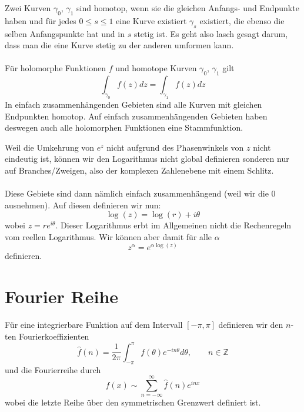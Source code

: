 \documentclass[11pt]{article}
\newenvironment{problem}[1]{
    \begin{trivlist}
        \item[\hskip \labelsep {\bfseries #1}] }{
    \end{trivlist}\normalshape
}
\newcommand{\Z}{\mathbb{Z}}
\begin{document}
    \begin{problem}{Homotopie}
        Zwei Kurven $\gamma_0$, $\gamma_1$ sind homotop, wenn sie die gleichen
        Anfangs- und Endpunkte haben und für jedes $0\leq s\leq 1$ eine
        Kurve existiert $\gamma_s$ existiert, die ebenso die selben Anfangspunkte
        hat und in $s$ stetig ist. Es geht also lasch gesagt darum, dass man
        die eine Kurve stetig zu der anderen umformen kann. \\\\
        Für holomorphe Funktionen $f$ und homotope Kurven $\gamma_0$, $\gamma_1$
        gilt
        $$\int_{\gamma_0}f(z)dz=\int_{\gamma_1}f(z)dz$$
        In einfach zusammenhängenden Gebieten sind alle Kurven mit gleichen
        Endpunkten homotop. Auf einfach zusammenhängenden Gebieten
        haben deswegen auch alle holomorphen Funktionen eine Stammfunktion.
    \end{problem}

    \begin{problem}{Komplexer Logarithmus}
        Weil die Umkehrung von $e^z$ nicht aufgrund des Phasenwinkels von $z$
        nicht eindeutig ist, können wir den Logarithmus nicht global definieren
        sonderen nur auf Branches/Zweigen, also der komplexen Zahlenebene mit
        einem Schlitz. \\\\
        Diese Gebiete sind dann nämlich einfach zusammenhängend (weil wir die
        $0$ ausnehmen). Auf diesen definieren wir nun:
        $$\log(z)=\log(r)+i\theta$$
        wobei $z=re^{i\theta}$. Dieser Logarithmus erbt im Allgemeinen nicht
        die Rechenregeln vom reellen Logarithmus. Wir können aber damit für
        alle $\alpha$
        $$z^{\alpha}=e^{\alpha\log(z)}$$
        definieren.
    \end{problem}

    \section{Fourier Reihe}
    \begin{problem}{Fourier Reihe}
        Für eine integrierbare Funktion auf dem Intervall $[-\pi,\pi]$ definieren wir
        den $n$-ten Fourierkoeffizienten
        $$\hat{f}(n)=\frac{1}{2\pi}\int_{-\pi}^{\pi} f(\theta)e^{-in\theta}d\theta, \qquad n\in\Z$$
        und die Fourierreihe durch
        $$f(x)\sim \sum_{n=-\infty}^\infty \hat{f}(n) e^{inx}$$
        wobei die letzte Reihe über den symmetrischen Grenzwert definiert ist.
    \end{problem}
\end{document}
